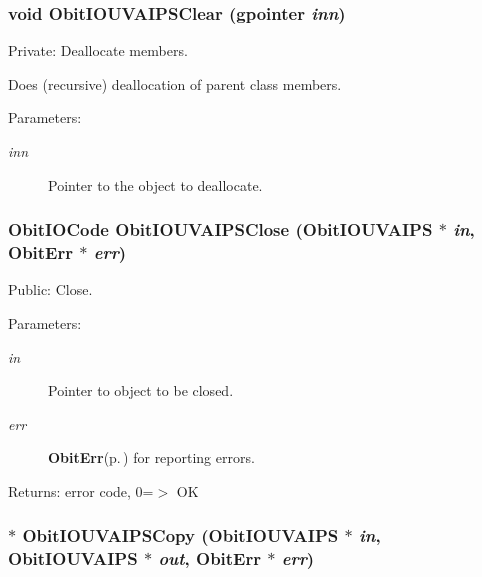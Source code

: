 \subsubsection{\setlength{\rightskip}{0pt plus 5cm}void Obit\-IOUVAIPSClear (gpointer {\em inn})}\label{ObitIOUVAIPS_8c_a4}


Private: Deallocate members. 

Does (recursive) deallocation of parent class members. \begin{Desc}
\item[Parameters:]
\begin{description}
\item[{\em inn}]Pointer to the object to deallocate. \end{description}
\end{Desc}
\subsubsection{\setlength{\rightskip}{0pt plus 5cm}Obit\-IOCode Obit\-IOUVAIPSClose ({\bf Obit\-IOUVAIPS} $\ast$ {\em in}, {\bf Obit\-Err} $\ast$ {\em err})}\label{ObitIOUVAIPS_8c_a17}


Public: Close. 

\begin{Desc}
\item[Parameters:]
\begin{description}
\item[{\em in}]Pointer to object to be closed. \item[{\em err}]{\bf Obit\-Err}{\rm (p.\,\pageref{structObitErr})} for reporting errors. \end{description}
\end{Desc}
\begin{Desc}
\item[Returns:]error code, 0=$>$ OK \end{Desc}
\subsubsection{$\ast$ Obit\-IOUVAIPSCopy ({\bf Obit\-IOUVAIPS} $\ast$ {\em in}, {\bf Obit\-IOUVAIPS} $\ast$ {\em out}, {\bf Obit\-Err} $\ast$ {\em err})}\label{ObitIOUVAIPS_8c_a15}


